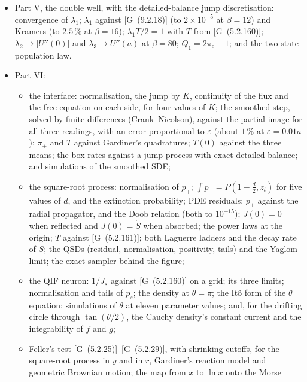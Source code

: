 \documentclass[11pt]{article}
\numberwithin{equation}{section}
\newcommand{\G}[1]{[G~(#1)]}
\begin{document}
\begin{itemize}
        Legendre eigenfunctions, Debye rate).
  \item Part V, the double well, with the detailed-balance jump discretisation: convergence of $\lambda_1$;
        $\lambda_1$ against \G{9.2.18} (to $2\times10^{-5}$ at $\beta=12$) and Kramers (to $2.5\,\%$ at $\beta=16$);
        $\lambda_1T/2=1$ with $T$ from \G{5.2.160}; $\lambda_2\to|U''(0)|$ and $\lambda_3\to U''(a)$ at $\beta=80$;
        $Q_1=2\pi_c-1$; and the two-state population law.
  \item Part VI:
        \begin{itemize}
          \item the interface: normalisation, the jump by $K$, continuity of the flux and the free equation on each side,
                for four values of $K$; the smoothed step, solved by finite differences (Crank--Nicolson), against the
                partial image for all three readings, with an error proportional to $\varepsilon$ (about $1\,\%$ at
                $\varepsilon=0.01a$); $\pi_+$ and $T$ against Gardiner's quadratures; $T(0)$ against the three means; the
                box rates against a jump process with exact detailed balance; and simulations of the smoothed SDE;
          \item the square-root process: normalisation of $p_+$; $\int p_-=P(1-\frac d2,z_t)$ for five values of $d$, and
                the extinction probability; PDE residuals; $p_+$ against the radial propagator, and the Doob relation
                (both to $10^{-15}$); $J(0)=0$ when reflected and $J(0)=\dot S$ when absorbed; the power laws at the
                origin; $T$ against \G{5.2.161}; both Laguerre ladders and the decay rate of $S$; the QSDs (residual,
                normalisation, positivity, tails) and the Yaglom limit; the exact sampler behind the figure;
          \item the QIF neuron: $1/J_s$ against \G{5.2.160} on a grid; its three limits; normalisation and tails of $p_s$;
                the density at $\theta=\pi$; the Itô form of the $\theta$ equation; simulations of $\theta$ at eleven
                parameter values; and, for the drifting circle through $\tan(\theta/2)$, the Cauchy density's constant
                current and the integrability of $f$ and $g$;
          \item Feller's test \G{5.2.25}--\G{5.2.29}, with shrinking cutoffs, for the square-root process in $y$ and in
                $r$, Gardiner's reaction model and geometric Brownian motion; the map from $x$ to $\ln x$ onto the Morse

\end{itemize}
\end{itemize}
\end{document}
